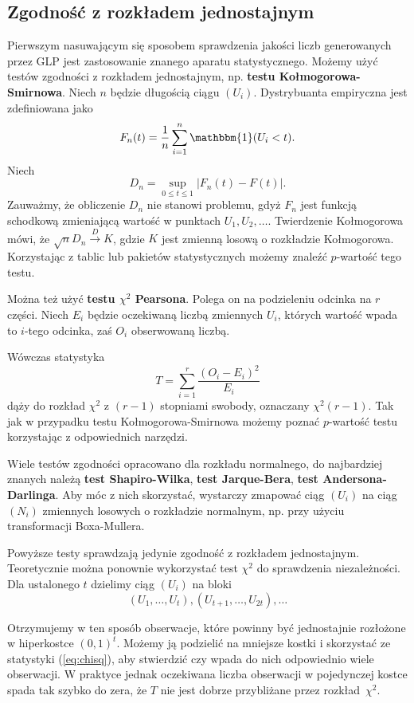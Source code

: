 \documentclass[a4paper,11pt,twoside]{book}
\newcommand{\Conv}{\longrightarrow}
\theoremstyle{definition}
\begin{document}
\subsection*{Zgodność z rozkładem jednostajnym}
Pierwszym nasuwającym się sposobem sprawdzenia jakości liczb generowanych przez GLP jest zastosowanie znanego aparatu statystycznego. Możemy użyć testów zgodności z rozkładem jednostajnym, np. \textbf{testu Kołmogorowa-Smirnowa}. Niech $n$ będzie długością ciągu $(U_i)$. Dystrybuanta empiryczna jest zdefiniowana jako
\[ F_n(t) = \frac{1}{n} \sum_{i=1}^n \mathbbm{1}(U_i < t). \]
Niech
\[ D_n = \sup_{0 \leq t \leq 1} |F_n(t) - F(t)|. \]
Zauważmy, że obliczenie $D_n$ nie stanowi problemu, gdyż $F_n$ jest funkcją schodkową zmieniającą wartość w punktach $U_1, U_2,\ldots$. Twierdzenie Kołmogorowa mówi, że $\sqrt{n} D_n \stackrel{D}{\Conv} K$, gdzie $K$ jest zmienną losową o rozkładzie Kołmogorowa. Korzystając z tablic lub pakietów statystycznych możemy znaleźć $p$-wartość tego testu.

Można też użyć \textbf{testu $\chi^2$ Pearsona}. Polega on na podzieleniu odcinka na $r$ części. Niech $E_i$ będzie oczekiwaną liczbą zmiennych $U_i$, których wartość wpada to $i$-tego odcinka, zaś $O_i$ obserwowaną liczbą.

Wówczas statystyka
\begin{equation}
 \label{eq:chisq}
 T = \sum_{i=1}^r \frac{(O_i - E_i)^2}{E_i} 
\end{equation}
dąży do rozkład $\chi^2$ z $(r-1)$ stopniami swobody, oznaczany $\chi^2(r-1)$. Tak jak w przypadku testu Kołmogorowa-Smirnowa możemy poznać $p$-wartość testu korzystając z odpowiednich narzędzi.

Wiele testów zgodności opracowano dla rozkładu normalnego, do najbardziej znanych należą \textbf{test Shapiro-Wilka}, \textbf{test Jarque-Bera}, \textbf{test Andersona-Darlinga}. Aby móc z nich skorzystać, wystarczy zmapować ciąg $(U_i)$ na ciąg $(N_i)$ zmiennych losowych o rozkładzie normalnym, np. przy użyciu transformacji Boxa-Mullera.

Powyższe testy sprawdzają jedynie zgodność z rozkładem jednostajnym. Teoretycznie można ponownie wykorzystać test $\chi^2$ do sprawdzenia niezależności. Dla ustalonego $t$ dzielimy ciąg $(U_i)$ na bloki 
\begin{equation}
  \label{eq:u_blok}
 (U_1,\ldots,U_t), (U_{t+1},\ldots,U_{2t}), \ldots
\end{equation}

Otrzymujemy w ten sposób obserwacje, które powinny być jednostajnie rozłożone w hiperkostce $(0,1)^t$. Możemy ją podzielić na mniejsze kostki i skorzystać ze statystyki (\ref{eq:chisq}), aby stwierdzić czy wpada do nich odpowiednio wiele obserwacji. W praktyce jednak oczekiwana liczba obserwacji w pojedynczej kostce spada tak szybko do zera, że $T$ nie jest dobrze przybliżane przez rozkład~$\chi^2$.
\end{document}
